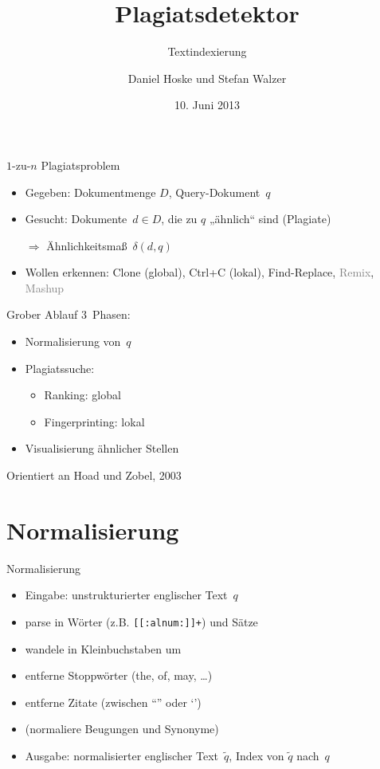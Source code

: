 \documentclass[german,simple]{mybeamer}
\title{Plagiatsdetektor}
\subtitle{Textindexierung}
\date{10. Juni 2013}
\author{Daniel Hoske und Stefan Walzer}
\begin{document}
\maketitle

\begin{frame}{$1$-zu-$n$ Plagiatsproblem}
\begin{itemize}
  \item Gegeben: Dokumentmenge $D$, Query-Dokument~$q$
  \item Gesucht: Dokumente~$d \in D$, die zu $q$ „ähnlich“ sind (Plagiate)
  \item[$\Rightarrow$] Ähnlichkeitsmaß~$\delta(d, q)$
  \item Wollen erkennen: \alert{Clone (global)}, \alert{Ctrl+C (lokal)}, Find-Replace, \textcolor{gray}{Remix}, \textcolor{gray}{Mashup}
\end{itemize}
\end{frame}

\begin{frame}{Grober Ablauf}
$3$~Phasen:
\begin{itemize}
    \item Normalisierung von~$q$
    \item Plagiatssuche:
    \begin{itemize}
      \item Ranking: global
      \item Fingerprinting: lokal
    \end{itemize}
    \item Visualisierung ähnlicher Stellen
\end{itemize}
Orientiert an Hoad und Zobel, 2003
\end{frame}

\section{Normalisierung}

\begin{frame}{Normalisierung}
\begin{itemize}
    \item Eingabe: unstrukturierter englischer Text~$q$
    \item<2-> parse in Wörter (z.B. \lstinline{[[:alnum:]]+}) und Sätze
    \item<2-> wandele in Kleinbuchstaben um
    \item<2-> entferne Stoppwörter (the, of, may, \dots)
    \item<2-> entferne Zitate (zwischen ``'' oder `')
    \item<2-> (normaliere Beugungen und Synonyme)
    \item Ausgabe: normalisierter englischer Text~$\widetilde{q}$, Index von $\widetilde{q}$ nach~$q$
\end{itemize}
\end{frame}
\end{document}
